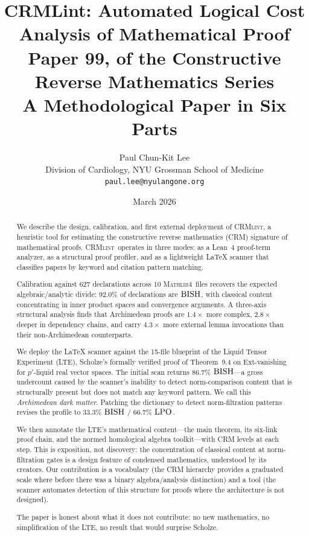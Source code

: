 \documentclass[11pt,a4paper]{article}
\theoremstyle{plain}
\theoremstyle{definition}
\newcommand{\BISH}{\textup{BISH}}
\newcommand{\LPO}{\textup{LPO}}
\newcommand{\CRMlint}{\textsc{CRMlint}}
\newcommand{\Mathlib}{\textsc{Mathlib4}}
\begin{document}
\title{\textbf{CRMLint: Automated Logical Cost Analysis of Mathematical Proof}\\[6pt]
\large Paper 99, of the Constructive Reverse Mathematics Series\\[3pt]
\normalsize A Methodological Paper in Six Parts}

\author{Paul Chun-Kit Lee\\
\small Division of Cardiology, NYU Grossman School of Medicine\\
\small \texttt{paul.lee@nyulangone.org}}

\date{March 2026}

\maketitle

\begin{abstract}
We describe the design, calibration, and first external deployment of
\CRMlint, a heuristic tool for estimating the constructive reverse
mathematics (CRM) signature of mathematical proofs.  \CRMlint\ operates
in three modes: as a Lean~4 proof-term analyzer, as a structural proof
profiler, and as a lightweight LaTeX scanner that classifies papers by
keyword and citation pattern matching.

Calibration against 627 declarations across 10 \Mathlib\ files recovers
the expected algebraic/analytic divide: 92.0\% of declarations are
$\BISH$, with classical content concentrating in inner product spaces
and convergence arguments.  A three-axis structural analysis finds
that Archimedean proofs are $1.4\times$ more complex, $2.8\times$ deeper
in dependency chains, and carry $4.3\times$ more external lemma
invocations than their non-Archimedean counterparts.

We deploy the LaTeX scanner against the 15-file blueprint of the
Liquid Tensor Experiment (LTE), Scholze's formally verified proof of
Theorem~9.4 on Ext-vanishing for $p'$-liquid real vector spaces.  The
initial scan returns 86.7\% $\BISH$---a gross undercount caused by
the scanner's inability to detect norm-comparison content that is
structurally present but does not match any keyword pattern.  We call
this \emph{Archimedean dark matter}.  Patching the dictionary to detect
norm-filtration patterns revises the profile to 33.3\% $\BISH$ /
66.7\% $\LPO$.

We then annotate the LTE's mathematical content---the main theorem,
its six-link proof chain, and the normed homological algebra toolkit---with
CRM levels at each step.  This is exposition, not discovery: the
concentration of classical content at norm-filtration gates is a design
feature of condensed mathematics, understood by its creators.  Our
contribution is a vocabulary (the CRM hierarchy provides a graduated
scale where before there was a binary algebra/analysis distinction) and
a tool (the scanner automates detection of this structure for proofs
where the architecture is not designed).

The paper is honest about what it does not contribute: no new
mathematics, no simplification of the LTE, no result that would
surprise Scholze.
\end{abstract}
\end{document}
